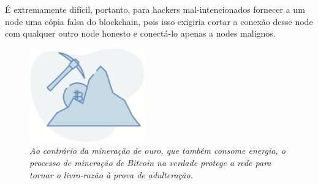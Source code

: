 
É extremamente difícil, portanto, para hackers mal-intencionados fornecer a um node uma cópia falsa do blockchain, pois isso exigiria cortar a conexão desse node com qualquer outro node honesto e conectá-lo apenas a nodes malignos.








\begin{figure}
  \centering
  \includegraphics[width=5cm]{imagens/capitulo-06-mineracao.jpg}
  \caption*{\textit{\small Ao contrário da mineração de ouro, que também consome energia, o processo de mineração de Bitcoin na verdade protege a rede para tornar o livro-razão à prova de adulteração.}}
\end{figure}




